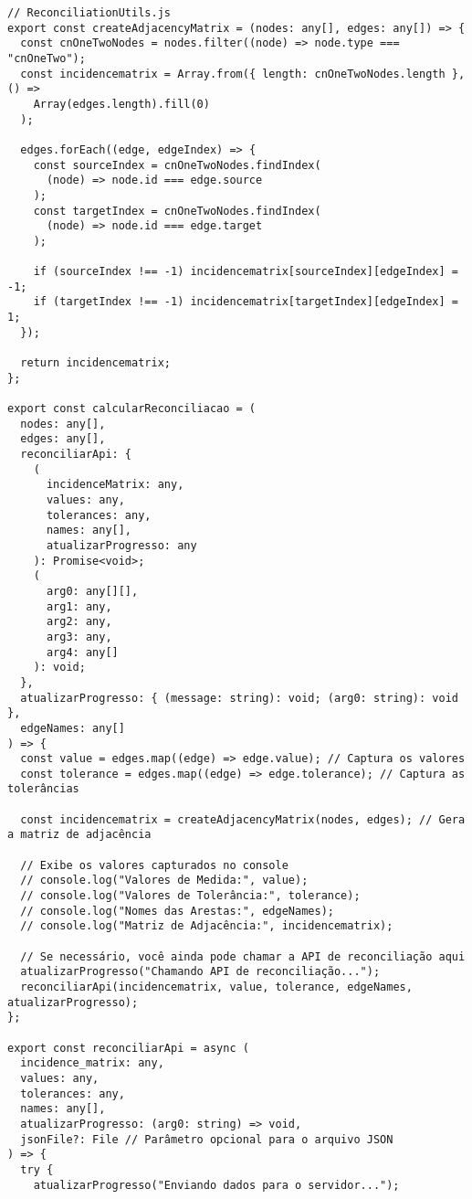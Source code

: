 \begin{verbatim}
// ReconciliationUtils.js
export const createAdjacencyMatrix = (nodes: any[], edges: any[]) => {
  const cnOneTwoNodes = nodes.filter((node) => node.type === "cnOneTwo");
  const incidencematrix = Array.from({ length: cnOneTwoNodes.length }, () =>
    Array(edges.length).fill(0)
  );

  edges.forEach((edge, edgeIndex) => {
    const sourceIndex = cnOneTwoNodes.findIndex(
      (node) => node.id === edge.source
    );
    const targetIndex = cnOneTwoNodes.findIndex(
      (node) => node.id === edge.target
    );

    if (sourceIndex !== -1) incidencematrix[sourceIndex][edgeIndex] = -1;
    if (targetIndex !== -1) incidencematrix[targetIndex][edgeIndex] = 1;
  });

  return incidencematrix;
};

export const calcularReconciliacao = (
  nodes: any[],
  edges: any[],
  reconciliarApi: {
    (
      incidenceMatrix: any,
      values: any,
      tolerances: any,
      names: any[],
      atualizarProgresso: any
    ): Promise<void>;
    (
      arg0: any[][],
      arg1: any,
      arg2: any,
      arg3: any,
      arg4: any[]
    ): void;
  },
  atualizarProgresso: { (message: string): void; (arg0: string): void },
  edgeNames: any[]
) => {
  const value = edges.map((edge) => edge.value); // Captura os valores
  const tolerance = edges.map((edge) => edge.tolerance); // Captura as tolerâncias

  const incidencematrix = createAdjacencyMatrix(nodes, edges); // Gera a matriz de adjacência

  // Exibe os valores capturados no console
  // console.log("Valores de Medida:", value);
  // console.log("Valores de Tolerância:", tolerance);
  // console.log("Nomes das Arestas:", edgeNames);
  // console.log("Matriz de Adjacência:", incidencematrix);

  // Se necessário, você ainda pode chamar a API de reconciliação aqui
  atualizarProgresso("Chamando API de reconciliação...");
  reconciliarApi(incidencematrix, value, tolerance, edgeNames, atualizarProgresso);
};

export const reconciliarApi = async (
  incidence_matrix: any,
  values: any,
  tolerances: any,
  names: any[],
  atualizarProgresso: (arg0: string) => void,
  jsonFile?: File // Parâmetro opcional para o arquivo JSON
) => {
  try {
    atualizarProgresso("Enviando dados para o servidor...");


\end{verbatim}

